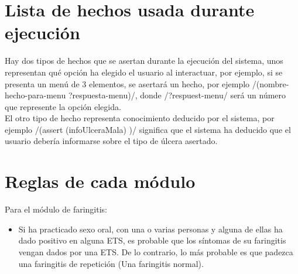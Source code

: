 \section{Lista de hechos usada durante ejecución}

Hay dos tipos de hechos que se asertan durante la ejecución del sistema, unos representan qué opción ha elegido el usuario al interactuar, por ejemplo, si se presenta un menú de 3 elementos, se asertará un hecho, por ejemplo \newlispinline/(nombre-hecho-para-menu ?respuesta-menu)/, donde \newlispinline/?respuest-menu/ será un número que represente la opción elegida.\\
El otro tipo de hecho representa conocimiento deducido por el sistema, por ejemplo \newlispinline/(assert (infoUlceraMala) )/ significa que el sistema ha deducido que el usuario debería informarse sobre el tipo de úlcera asertado.

\section{Reglas de cada módulo}

Para el módulo de faringitis:
\begin{itemize}
  \item Si ha practicado sexo oral, con una o varias personas y alguna de ellas ha dado positivo en alguna ETS, es probable que los síntomas de su faringitis vengan dados por una ETS. De lo contrario, lo más probable es que padezca una faringitis de repetición (Una faringitis normal).
\end{itemize}

